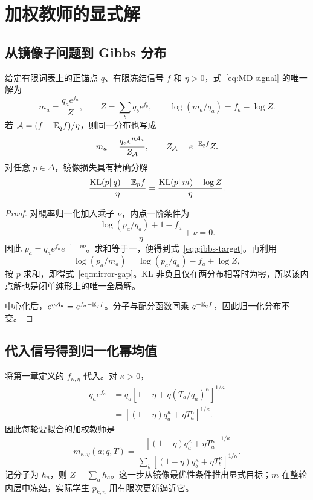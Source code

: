 \chapter{加权教师的显式解}
\label{ch:target}
\section{从镜像子问题到 Gibbs 分布}
\begin{theorem}[镜像子问题的唯一目标教师]
\label{thm:target}
给定有限词表上的正锚点 $q$、有限冻结信号 $f$ 和 $\eta>0$，式~\eqref{eq:MD-signal} 的唯一解为
\begin{equation}
m_a=\frac{q_ae^{f_a}}{Z},\qquad
Z=\sum_bq_be^{f_b},\qquad
\log(m_a/q_a)=f_a-\log Z.
\label{eq:gibbs-target}
\end{equation}
若 $\mathcal A=(f-\mathbb E_qf)/\eta$，则同一分布也写成
\begin{equation}
m_a=\frac{q_ae^{\eta\mathcal A_a}}{Z_{\mathcal A}},
\qquad Z_{\mathcal A}=e^{-\mathbb E_qf}Z.
\end{equation}
对任意 $p\in\Delta$，镜像损失具有精确分解
\begin{equation}
\frac{\operatorname{KL}(p\Vert q)-\mathbb E_pf}{\eta}
=\frac{\operatorname{KL}(p\Vert m)-\log Z}{\eta}.
\label{eq:mirror-gap}
\end{equation}
\end{theorem}
\begin{proof}
对概率归一化加入乘子 $\nu$，内点一阶条件为
\begin{equation}
\frac{\log(p_a/q_a)+1-f_a}{\eta}+\nu=0.
\end{equation}
因此 $p_a=q_ae^{f_a}e^{-1-\eta\nu}$。求和等于一，便得到式~\eqref{eq:gibbs-target}。再利用
\begin{equation}
\log(p_a/m_a)=\log(p_a/q_a)-f_a+\log Z,
\end{equation}
按 $p$ 求和，即得式~\eqref{eq:mirror-gap}。KL 非负且仅在两分布相等时为零，所以该内点解也是闭单纯形上的唯一全局解。

中心化后，$e^{\eta\mathcal A_a}=e^{f_a-\mathbb E_qf}$。分子与配分函数同乘 $e^{-\mathbb E_qf}$，因此归一化分布不变。
\end{proof}

\section{代入信号得到归一化幂均值}
将第一章定义的 $f_{\kappa,\eta}$ 代入。对 $\kappa>0$，
\begin{align}
q_ae^{f_a}
&=q_a\left[1-\eta+\eta(T_a/q_a)^\kappa\right]^{1/\kappa}\\
&=\left[(1-\eta)q_a^\kappa+\eta T_a^\kappa\right]^{1/\kappa}.
\end{align}
因此每轮要拟合的加权教师是
\begin{equation}
\boxed{
m_{\kappa,\eta}(a;q,T)
=\frac{\left[(1-\eta)q_a^\kappa+\eta T_a^\kappa\right]^{1/\kappa}}
{\displaystyle\sum_b\left[(1-\eta)q_b^\kappa+\eta T_b^\kappa\right]^{1/\kappa}}.
}
\label{eq:target}
\end{equation}
记分子为 $h_a$，则 $Z=\sum_ah_a$。这一步从镜像最优性条件推出显式目标；$m$ 在整轮内层中冻结，实际学生 $p_{k,n}$ 用有限次更新逼近它。

